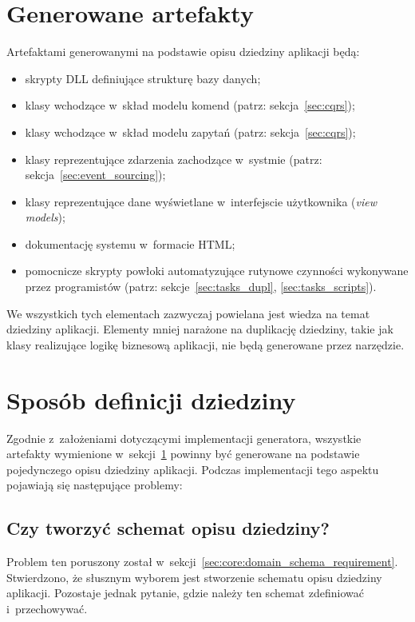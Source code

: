 \section{Generowane artefakty} \label{sec:generated_artifacts}

Artefaktami generowanymi na podstawie opisu dziedziny aplikacji będą:

\begin{itemize}
 \item skrypty DLL definiujące strukturę bazy danych;
 \item klasy wchodzące w~skład modelu komend (patrz: sekcja~\ref{sec:cqrs});
 \item klasy wchodzące w~skład modelu zapytań (patrz: sekcja~\ref{sec:cqrs});
 \item klasy reprezentujące zdarzenia zachodzące w~systmie (patrz: sekcja~\ref{sec:event_sourcing});
 \item klasy reprezentujące dane wyświetlane w~interfejscie użytkownika (\emph{view models});
 \item dokumentację systemu w~formacie HTML;
 \item pomocnicze skrypty powłoki automatyzujące rutynowe czynności wykonywane przez programistów (patrz: sekcje~\ref{sec:tasks_dupl}, \ref{sec:tasks_scripts}).
\end{itemize}

We wszystkich tych elementach zazwyczaj powielana jest wiedza na temat dziedziny aplikacji.
Elementy mniej narażone na duplikację dziedziny, takie jak klasy realizujące logikę biznesową aplikacji, nie będą generowane przez narzędzie.



\section{Sposób definicji dziedziny}

Zgodnie z~założeniami dotyczącymi implementacji generatora, wszystkie artefakty wymienione w~sekcji~\ref{sec:generated_artifacts} powinny być generowane na podstawie pojedynczego opisu dziedziny aplikacji.
Podczas implementacji tego aspektu pojawiają się następujące problemy:


\subsection{Czy tworzyć schemat opisu dziedziny?}

Problem ten poruszony został w~sekcji~\ref{sec:core:domain_schema_requirement}.
Stwierdzono, że słusznym wyborem jest stworzenie schematu opisu dziedziny aplikacji.
Pozostaje jednak pytanie, gdzie należy ten schemat zdefiniować i~przechowywać.

